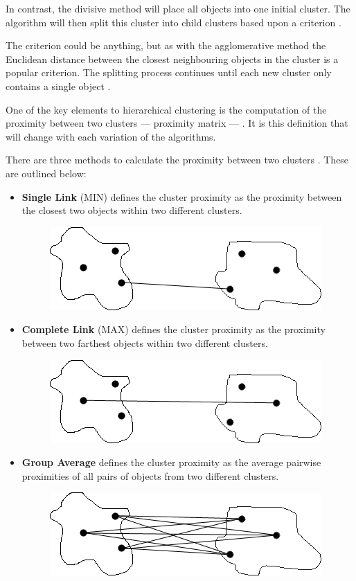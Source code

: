 In contrast, the divisive method will place all objects into one initial cluster. 
The algorithm will then split this cluster into child clusters based upon a 
criterion \citep{tan05}. 

The criterion could be anything, but as with the agglomerative method the 
Euclidean distance between the closest neighbouring objects in the cluster is 
a popular criterion. The splitting process continues until each new cluster 
only contains a single object \citep{han06}.

One of the key elements to hierarchical clustering is the computation of the 
proximity between two clusters --- proximity matrix --- \citep{tan05}. It is 
this definition that will change with each variation of the algorithms. 

There are three methods to calculate the proximity between two clusters
\citep{tan05}. These are outlined below:

\begin{itemize} 
  \item \textbf{Single Link} (MIN) defines the cluster proximity as the 
        proximity between the closest two objects within two different 
        clusters. 
        \begin{figure}[H]
          \centering
          \includegraphics[width=0.60\linewidth]{chapter3/clustering/min.png}
        \end{figure}

  \item \textbf{Complete Link} (MAX) defines the cluster proximity as the 
        proximity between two farthest objects within two different clusters.
        \begin{figure}[H]
          \centering
          \includegraphics[width=0.60\linewidth]{chapter3/clustering/max.png}
        \end{figure}

  \item \textbf{Group Average} defines the cluster proximity as the average 
        pairwise proximities of all pairs of objects from two different 
        clusters.
        \begin{figure}[H]
          \centering
          \includegraphics[width=0.60\linewidth]{chapter3/clustering/group_average.png}
        \end{figure}
\end{itemize}


